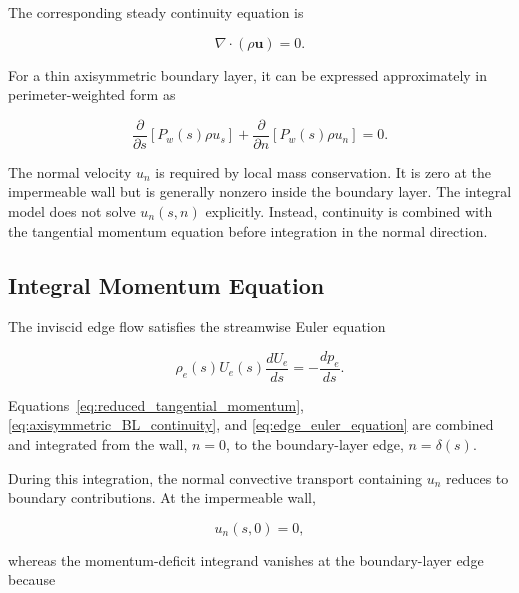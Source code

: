 The corresponding steady continuity equation is

\begin{equation}
    \nabla\cdot(\rho\boldsymbol{u})=0.
    \label{eq:steady_continuity_BL}
\end{equation}

For a thin axisymmetric boundary layer, it can be expressed approximately in
perimeter-weighted form as

\begin{equation}
    \boxed{
    \frac{\partial}{\partial s}
    \left[
        P_w(s)\rho u_s
    \right]
    +
    \frac{\partial}{\partial n}
    \left[
        P_w(s)\rho u_n
    \right]
    =0
    }.
    \label{eq:axisymmetric_BL_continuity}
\end{equation}

The normal velocity \(u_n\) is required by local mass conservation. It is zero
at the impermeable wall but is generally nonzero inside the boundary layer.
The integral model does not solve \(u_n(s,n)\) explicitly. Instead, continuity
is combined with the tangential momentum equation before integration in the
normal direction.

\subsection{Integral Momentum Equation}

The inviscid edge flow satisfies the streamwise Euler equation

\begin{equation}
    \boxed{
    \rho_e(s)U_e(s)\frac{dU_e}{ds}
    =
    -\frac{dp_e}{ds}
    }.
    \label{eq:edge_euler_equation}
\end{equation}

Equations~\eqref{eq:reduced_tangential_momentum},
\eqref{eq:axisymmetric_BL_continuity}, and
\eqref{eq:edge_euler_equation} are combined and integrated from the wall,
\(n=0\), to the boundary-layer edge, \(n=\delta(s)\).

During this integration, the normal convective transport containing \(u_n\)
reduces to boundary contributions. At the impermeable wall,

\begin{equation}
    u_n(s,0)=0,
\end{equation}

whereas the momentum-deficit integrand vanishes at the boundary-layer edge
because

